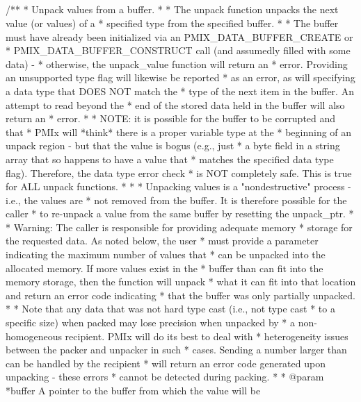 \subsection{}

\cspecificstart
\begin{codepar}
/**
 * Unpack values from a buffer.
 *
 * The unpack function unpacks the next value (or values) of a
 * specified type from the specified buffer.
 *
 * The buffer must have already been initialized via an PMIX_DATA_BUFFER_CREATE or
 * PMIX_DATA_BUFFER_CONSTRUCT call (and assumedly filled with some data) -
 * otherwise, the unpack_value function will return an
 * error. Providing an unsupported type flag will likewise be reported
 * as an error, as will specifying a data type that DOES NOT match the
 * type of the next item in the buffer. An attempt to read beyond the
 * end of the stored data held in the buffer will also return an
 * error.
 *
 * NOTE: it is possible for the buffer to be corrupted and that
 * PMIx will *think* there is a proper variable type at the
 * beginning of an unpack region - but that the value is bogus (e.g., just
 * a byte field in a string array that so happens to have a value that
 * matches the specified data type flag). Therefore, the data type error check
 * is NOT completely safe. This is true for ALL unpack functions.
 *
 *
 * Unpacking values is a "nondestructive" process - i.e., the values are
 * not removed from the buffer. It is therefore possible for the caller
 * to re-unpack a value from the same buffer by resetting the unpack_ptr.
 *
 * Warning: The caller is responsible for providing adequate memory
 * storage for the requested data. As noted below, the user
 * must provide a parameter indicating the maximum number of values that
 * can be unpacked into the allocated memory. If more values exist in the
 * buffer than can fit into the memory storage, then the function will unpack
 * what it can fit into that location and return an error code indicating
 * that the buffer was only partially unpacked.
 *
 * Note that any data that was not hard type cast (i.e., not type cast
 * to a specific size) when packed may lose precision when unpacked by
 * a non-homogeneous recipient.  PMIx will do its best to deal with
 * heterogeneity issues between the packer and unpacker in such
 * cases. Sending a number larger than can be handled by the recipient
 * will return an error code generated upon unpacking - these errors
 * cannot be detected during packing.
 *
 * @param *buffer A pointer to the buffer from which the value will be

\end{codepar}
